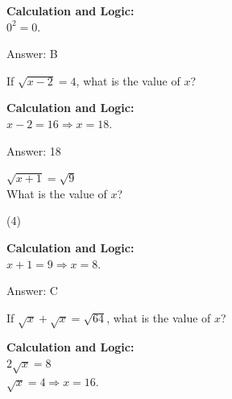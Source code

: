 \documentclass[11pt,paper=a4,answers]{exam}
\begin{document}
\begin{questions}
\begin{solution}
\textbf{Calculation and Logic:} \\
$0^2 = 0$.

\vspace{25pt}

Answer: \colorbox{yellow!100}{B}
\end{solution}

\vspace{40pt}

\question
If $\sqrt{x-2} = 4$, what is the value of $x$?

\begin{solution}
\textbf{Calculation and Logic:} \\
$x - 2 = 16 \Rightarrow x = 18$.

\vspace{25pt}

Answer: \colorbox{yellow!100}{18}
\end{solution}

\vspace{40pt}

\question
$\sqrt{x+1} = \sqrt{9}$ \\
What is the value of $x$?
\begin{tasks}(4)
\end{tasks}

\begin{solution}
\textbf{Calculation and Logic:} \\
$x + 1 = 9 \Rightarrow x = 8$.

\vspace{25pt}

Answer: \colorbox{yellow!100}{C}
\end{solution}

\vspace{40pt}

\question
If $\sqrt{x} + \sqrt{x} = \sqrt{64}$, what is the value of $x$?

\begin{solution}
\textbf{Calculation and Logic:} \\
$2\sqrt{x} = 8$ \\
$\sqrt{x} = 4 \Rightarrow x = 16$.

\vspace{25pt}


\end{solution}
\end{questions}
\end{document}
